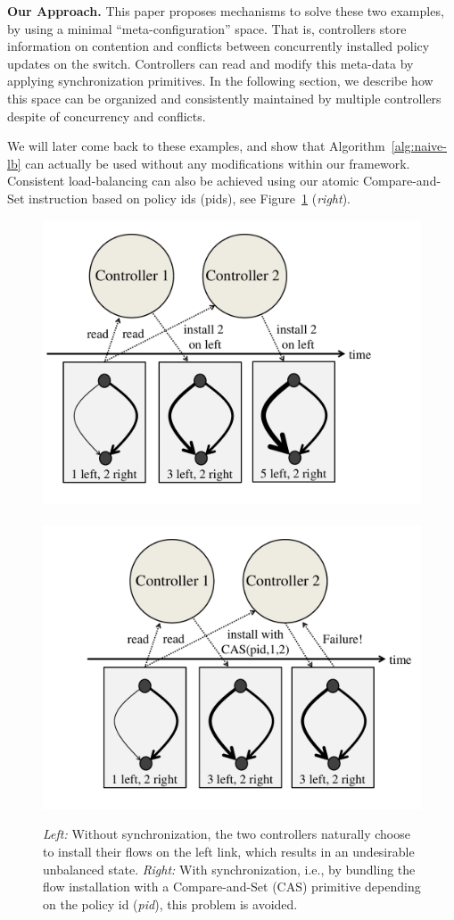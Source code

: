 \documentclass[conference]{sigcomm-alternate}
\begin{document}
\vspace{2mm}
\noindent\textbf{Our Approach.}
This paper proposes mechanisms to solve these two examples,
by using a minimal
``meta-configuration'' space. That is, controllers store information
on contention and conflicts between
concurrently installed policy updates on the switch. Controllers can read and modify
this meta-data by applying synchronization primitives.
In the following section, we
describe how this space can be organized and consistently maintained
by multiple controllers despite of concurrency and conflicts.

We will later come back to these examples, and show that Algorithm~\ref{alg:naive-lb}
can actually be used without any modifications within our framework.
Consistent load-balancing can also be achieved using our atomic Compare-and-Set instruction based on policy ids (pids),
see Figure~\ref{fig:CAS-example} (\emph{right}).

\begin{figure}[t]
\centering
\includegraphics[width=.56\columnwidth]{loadbal-1.pdf}~\hspace{-.7cm}~\includegraphics[width=.56\columnwidth]{loadbal-2.pdf}\\
\caption{\emph{Left:} Without synchronization, the two controllers naturally choose to
install their flows on the left link, which results in an undesirable
unbalanced state.
 \emph{Right:}
 With synchronization, i.e., by bundling the flow installation with a Compare-and-Set (CAS) primitive
 depending on the policy id (\emph{pid}), this problem is avoided.}\label{fig:CAS-example}
\end{figure}
\end{document}
